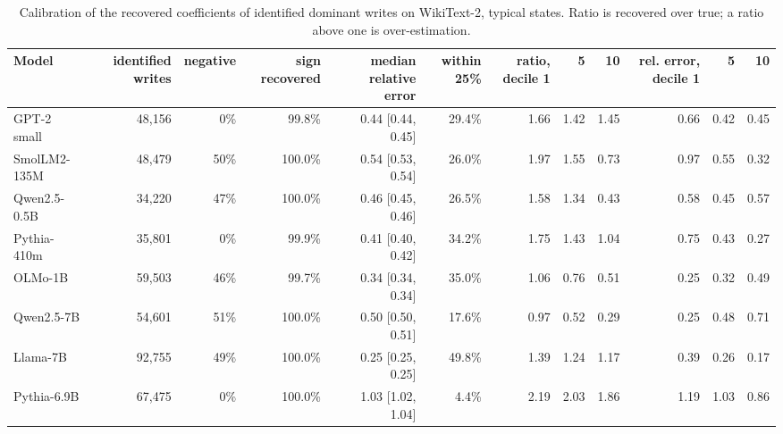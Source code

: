 \begin{table}[H]\centering\scriptsize
\caption{Calibration of the recovered coefficients of identified dominant writes on WikiText-2, typical states. Ratio is recovered over true; a ratio above one is over-estimation.}\label{app:ci-calib-wikitext}
\begin{adjustbox}{max width=\linewidth}
\begin{tabular}{lrrrrrrrrrrr}\toprule
Model & identified writes & negative & sign recovered & median relative error & within 25\% & ratio, decile 1 & 5 & 10 & rel. error, decile 1 & 5 & 10 \\ \midrule
GPT-2 small & 48,156 & 0\% & 99.8\% & 0.44 [0.44, 0.45] & 29.4\% & 1.66 & 1.42 & 1.45 & 0.66 & 0.42 & 0.45 \\
SmolLM2-135M & 48,479 & 50\% & 100.0\% & 0.54 [0.53, 0.54] & 26.0\% & 1.97 & 1.55 & 0.73 & 0.97 & 0.55 & 0.32 \\
Qwen2.5-0.5B & 34,220 & 47\% & 100.0\% & 0.46 [0.45, 0.46] & 26.5\% & 1.58 & 1.34 & 0.43 & 0.58 & 0.45 & 0.57 \\
Pythia-410m & 35,801 & 0\% & 99.9\% & 0.41 [0.40, 0.42] & 34.2\% & 1.75 & 1.43 & 1.04 & 0.75 & 0.43 & 0.27 \\
OLMo-1B & 59,503 & 46\% & 99.7\% & 0.34 [0.34, 0.34] & 35.0\% & 1.06 & 0.76 & 0.51 & 0.25 & 0.32 & 0.49 \\
Qwen2.5-7B & 54,601 & 51\% & 100.0\% & 0.50 [0.50, 0.51] & 17.6\% & 0.97 & 0.52 & 0.29 & 0.25 & 0.48 & 0.71 \\
Llama-7B & 92,755 & 49\% & 100.0\% & 0.25 [0.25, 0.25] & 49.8\% & 1.39 & 1.24 & 1.17 & 0.39 & 0.26 & 0.17 \\
Pythia-6.9B & 67,475 & 0\% & 100.0\% & 1.03 [1.02, 1.04] & 4.4\% & 2.19 & 2.03 & 1.86 & 1.19 & 1.03 & 0.86 \\
\bottomrule\end{tabular}\end{adjustbox}
\end{table}
